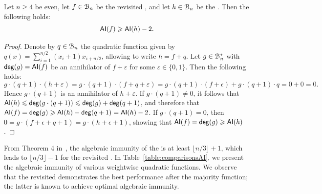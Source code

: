 \documentclass[11pt]{llncs}
\begin{document}
\begin{proposition}
    Let $n\geq 4$ be even, let $f\in\mathcal{B}_n$ be the revisited \hwbf{}, and let $h\in\mathcal{B}_n$ be the \hwbf{}. Then the following holds:
	\[\mathsf{AI}(f)\geqslant \mathsf{AI}(h)-2.\]
\end{proposition}

\begin{proof}
	Denote by $q\in\mathcal{B}_n$ the quadratic function given by $q(x)=\sum_{i=1}^{n/2} (x_i+1) x_{i+n/2}$, allowing to write $h=f+q$.
    Let $g\in\mathcal{B}_n^*$ with $\mathsf{deg}(g)=\mathsf{AI}(f)$ be an annihilator of $f+ \varepsilon$ for some $\varepsilon\in\{0,1\}$. Then the following holds:
	\[g\cdot(q+1) \cdot(h+\varepsilon) = g\cdot(q+1)\cdot(f+q+\varepsilon)=g\cdot(q+1)\cdot(f+\epsilon)+g\cdot(q+1)\cdot q=0+0=0.\]
	Hence $g\cdot(q+1)$ is an annihilator of $h+ \varepsilon$. 
	If $g\cdot(q+1)\ne 0$, it follows that $\mathsf{AI}(h)\leqslant\mathsf{deg}(g\cdot(q+1))\leqslant\mathsf{deg}(g)+\mathsf{deg}(q+1)$, and therefore that $\mathsf{AI}(f)=\mathsf{deg}(g)\geqslant\mathsf{AI}(h)-\mathsf{deg}(q+1)=\mathsf{AI}(h)-2$. If $g\cdot(q+1)=0$, then $0=g\cdot(f+\epsilon+q+1)=g\cdot(h+\epsilon+1)$, showing that $\mathsf{AI}(f)=\mathsf{deg}(g)\geqslant\mathsf{AI}(h)$.
\end{proof}

From Theorem 4 in~\cite{DAM:WCST14}, the algebraic immunity of the \hwbf{} is at least $\lfloor n/3\rfloor +1$, which leads to $\lfloor n/3\rfloor -1$ for the revisited \hwbf{}.
In Table~\ref{table:comparisonsAI}, we present the algebraic immunity of various weightwise quadratic functions. We observe that the revisited \hwbf{} demonstrates the best performance after the majority function; the latter is known to achieve optimal algebraic immunity.

\end{document}
